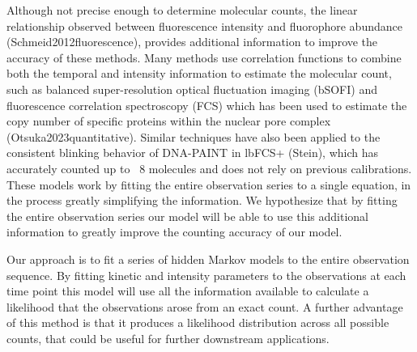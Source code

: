 Although not precise enough to determine molecular counts, the linear
relationship observed between fluorescence intensity and fluorophore abundance
(Schmeid2012fluorescence), provides additional information to improve the
accuracy of these methods.
%
  Many methods use correlation functions to combine both the temporal and
  intensity information to estimate the molecular count, such as balanced
  super-resolution optical fluctuation imaging (bSOFI) and fluorescence
  correlation spectroscopy (FCS) which has been used to estimate the copy
  number of specific proteins within the nuclear pore complex
  (Otsuka2023quantitative). Similar techniques have also been applied to the
  consistent blinking behavior of DNA-PAINT in lbFCS+ (Stein), which has
  accurately counted up to ~8 molecules and does not rely on previous
  calibrations. These models work by fitting the entire observation series to a
  single equation, in the process greatly simplifying the information. We
  hypothesize that by fitting the entire observation series our model will be
  able to use this additional information to greatly improve the counting
  accuracy of our model.

Our approach is to fit a series of hidden Markov models to the entire
observation sequence.
%
  By fitting kinetic and intensity parameters to the observations at each time
  point this model will use all the information available to calculate a
  likelihood that the observations arose from an exact count. A further
  advantage of this method is that it produces a likelihood distribution across
  all possible counts, that could be useful for further downstream
  applications.
